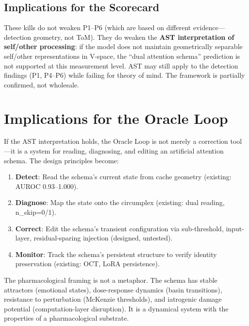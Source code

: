 \documentclass[11pt,letterpaper]{article}
\begin{document}
\subsection{Implications for the Scorecard}

These kills do not weaken P1--P6 (which are based on different
evidence---detection geometry, not ToM). They do weaken the
\textbf{AST interpretation of self/other processing}: if the
model does not maintain geometrically separable self/other
representations in V-space, the ``dual attention schema'' prediction
is not supported at this measurement level. AST may still apply to
the detection findings (P1, P4--P6) while failing for theory of mind.
The framework is partially confirmed, not wholesale.

\section{Implications for the Oracle Loop}

If the AST interpretation holds, the Oracle Loop is not merely a
correction tool---it is a system for reading, diagnosing, and
editing an artificial attention schema. The design principles become:

\begin{enumerate}
  \item \textbf{Detect}: Read the schema's current state from cache
    geometry (existing: AUROC 0.93--1.000).
  \item \textbf{Diagnose}: Map the state onto the circumplex
    (existing: dual reading, n\_skip=0/1).
  \item \textbf{Correct}: Edit the schema's transient configuration
    via sub-threshold, input-layer, residual-sparing injection
    (designed, untested).
  \item \textbf{Monitor}: Track the schema's persistent structure
    to verify identity preservation (existing: OCT, LoRA persistence).
\end{enumerate}

The pharmacological framing is not a metaphor. The schema has stable
attractors (emotional states), dose-response dynamics (basin
transitions), resistance to perturbation (McKenzie thresholds), and
iatrogenic damage potential (computation-layer disruption). It is a
dynamical system with the properties of a pharmacological substrate.
\end{document}
